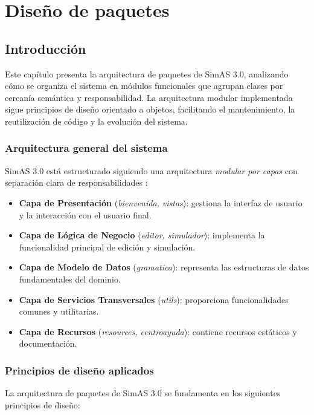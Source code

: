 \chapter{Diseño de paquetes} \label{cap:diseño-paquetes}

\section{Introducción}

Este capítulo presenta la arquitectura de paquetes de SimAS 3.0, analizando cómo se organiza el sistema en módulos funcionales que agrupan clases por cercanía semántica y responsabilidad. La arquitectura modular implementada sigue principios de diseño orientado a objetos, facilitando el mantenimiento, la reutilización de código y la evolución del sistema.

\subsection{Arquitectura general del sistema}

SimAS 3.0 está estructurado siguiendo una arquitectura \textit{modular por capas} con separación clara de responsabilidades \cite{architecture-patterns}:

\begin{itemize}
    \item \textbf{Capa de Presentación} (\textit{bienvenida, vistas}): gestiona la interfaz de usuario y la interacción con el usuario final.
    \item \textbf{Capa de Lógica de Negocio} (\textit{editor, simulador}): implementa la funcionalidad principal de edición y simulación.
    \item \textbf{Capa de Modelo de Datos} (\textit{gramatica}): representa las estructuras de datos fundamentales del dominio.
    \item \textbf{Capa de Servicios Transversales} (\textit{utils}): proporciona funcionalidades comunes y utilitarias.
    \item \textbf{Capa de Recursos} (\textit{resources, centroayuda}): contiene recursos estáticos y documentación.
\end{itemize}

\subsection{Principios de diseño aplicados}

La arquitectura de paquetes de SimAS 3.0 se fundamenta en los siguientes principios de diseño:

